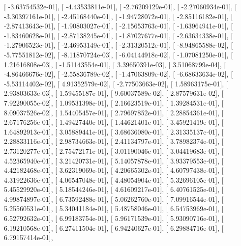 \documentclass{article}
\begin{document}
       [ -3.63754532e-01],
       [ -4.43533811e-01],
       [ -2.76209129e-01],
       [ -2.27060934e-01],
       [ -3.30397161e-01],
       [ -2.45168440e-01],
       [ -1.94728072e-01],
       [ -2.85116182e-01],
       [ -2.87413643e-01],
       [ -1.90803027e-01],
       [ -2.15653763e-01],
       [ -1.63964941e-01],
       [ -1.83460628e-01],
       [ -2.87138245e-01],
       [ -1.87027677e-01],
       [ -2.63634338e-01],
       [ -1.27906523e-01],
       [ -2.46953149e-01],
       [ -2.31320512e-01],
       [ -8.94865588e-02],
       [ -5.77551812e-02],
       [ -8.11870724e-03],
       [ -6.04144918e-02],
       [ -1.07081250e-01],
       [  1.21616808e-03],
       [ -1.51143554e-01],
       [  3.39650391e-03],
       [  3.51068799e-04],
       [ -4.86466676e-02],
       [ -2.55836789e-02],
       [ -1.47063809e-02],
       [ -6.68633634e-02],
       [ -5.53114402e-02],
       [  4.91352579e-02],
       [ -2.77503663e-02],
       [  1.58963175e-01],
       [  2.93803633e-03],
       [  1.59455187e-01],
       [  9.60037589e-02],
       [  2.87579631e-02],
       [  7.92290055e-02],
       [  1.09531398e-01],
       [  2.16623519e-01],
       [  1.39284531e-01],
       [  8.09037526e-02],
       [  1.54405457e-01],
       [  2.79697852e-01],
       [  2.28854361e-01],
       [  2.67176256e-01],
       [  1.49427440e-01],
       [  1.44621401e-01],
       [  3.45921419e-01],
       [  1.64892913e-01],
       [  3.05889441e-01],
       [  3.68636080e-01],
       [  2.31335137e-01],
       [  2.28833116e-01],
       [  2.98734663e-01],
       [  2.41134797e-01],
       [  3.78982374e-01],
       [  2.73120277e-01],
       [  2.75472171e-01],
       [  3.01190046e-01],
       [  3.04419683e-01],
       [  4.52365940e-01],
       [  3.21420731e-01],
       [  5.14057878e-01],
       [  3.93379553e-01],
       [  4.42182468e-01],
       [  3.62319069e-01],
       [  4.20665302e-01],
       [  4.60797438e-01],
       [  4.31922636e-01],
       [  4.06547048e-01],
       [  4.48054904e-01],
       [  5.32696105e-01],
       [  5.45529920e-01],
       [  5.18544246e-01],
       [  4.61609217e-01],
       [  6.40761525e-01],
       [  4.99874897e-01],
       [  6.73592488e-01],
       [  5.06262760e-01],
       [  7.09916544e-01],
       [  5.25560531e-01],
       [  5.34041184e-01],
       [  5.48758046e-01],
       [  6.54753969e-01],
       [  6.52792632e-01],
       [  6.99183754e-01],
       [  5.96171539e-01],
       [  5.93090716e-01],
       [  6.19210568e-01],
       [  6.27411504e-01],
       [  6.94240627e-01],
       [  6.29884716e-01],
       [  6.79157414e-01],
\end{document}
